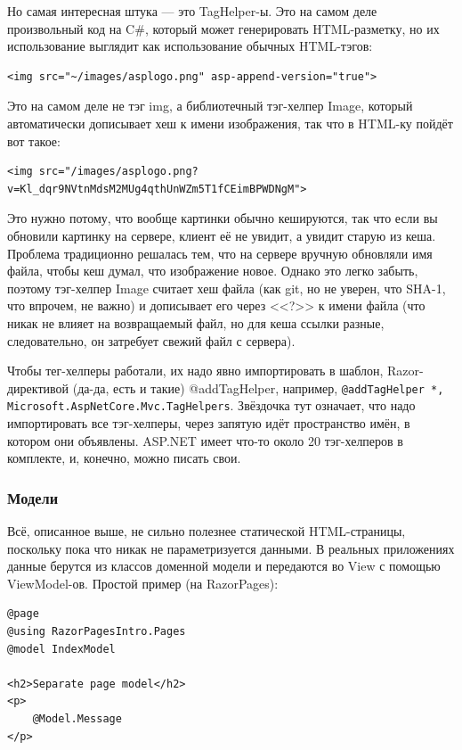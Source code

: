 \documentclass{../../text-style}
\begin{document}
Но самая интересная штука --- это TagHelper-ы. Это на самом деле произвольный код на C\#, который может генерировать HTML-разметку, но их использование выглядит как использование обычных HTML-тэгов:

\begin{verbatim}
<img src="~/images/asplogo.png" asp-append-version="true">
\end{verbatim}

Это на самом деле не тэг img, а библиотечный тэг-хелпер Image, который автоматически дописывает хеш к имени изображения, так что в HTML-ку пойдёт вот такое:

\begin{verbatim}
<img src="/images/asplogo.png?v=Kl_dqr9NVtnMdsM2MUg4qthUnWZm5T1fCEimBPWDNgM">
\end{verbatim}

Это нужно потому, что вообще картинки обычно кешируются, так что если вы обновили картинку на сервере, клиент её не увидит, а увидит старую из кеша. Проблема традиционно решалась тем, что на сервере вручную обновляли имя файла, чтобы кеш думал, что изображение новое. Однако это легко забыть, поэтому тэг-хелпер Image считает хеш файла (как git, но не уверен, что SHA-1, что впрочем, не важно) и дописывает его через <<?>> к имени файла (что никак не влияет на возвращаемый файл, но для кеша ссылки разные, следовательно, он затребует свежий файл с сервера).

Чтобы тег-хелперы работали, их надо явно импортировать в шаблон, Razor-директивой (да-да, есть и такие) @addTagHelper, например, \texttt{@addTagHelper *, Microsoft.AspNetCore.Mvc.TagHelpers}. Звёздочка тут означает, что надо импортировать все тэг-хелперы, через запятую идёт пространство имён, в котором они объявлены. ASP.NET имеет что-то около 20 тэг-хелперов в комплекте, и, конечно, можно писать свои.

\subsubsection{Модели}

Всё, описанное выше, не сильно полезнее статической HTML-страницы, поскольку пока что никак не параметризуется данными. В реальных приложениях данные берутся из классов доменной модели и передаются во View с помощью ViewModel-ов. Простой пример (на RazorPages):

\begin{verbatim}
@page
@using RazorPagesIntro.Pages
@model IndexModel

<h2>Separate page model</h2>
<p>
    @Model.Message
</p>
\end{verbatim}
\end{document}
